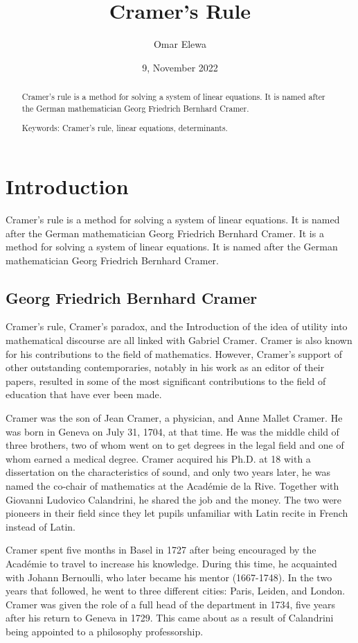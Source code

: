\documentclass[titlepage,a4paper]{article}
\title{Cramer's Rule}
\date{9, November 2022}
\author{Omar Elewa}
\begin{document}
  	\maketitle
    \begin{abstract}
        Cramer's rule is a method for solving a system of linear equations.
        It is named after the German mathematician Georg Friedrich Bernhard Cramer.
		
		Keywords: Cramer's rule, linear equations, determinants.
    \end{abstract}
  	\newpage
  	
	\section{Introduction}
    	Cramer's rule is a method for solving a system of linear equations.
    	It is named after the German mathematician Georg Friedrich Bernhard Cramer.
    	It is a method for solving a system of linear equations.
    	It is named after the German mathematician Georg Friedrich Bernhard Cramer.
    	\subsection{Georg Friedrich Bernhard Cramer}\label{subsec:georg-friedrich-bernhard-cramer}
				Cramer's rule, Cramer's paradox, and the Introduction of the idea of utility into mathematical discourse are all linked with Gabriel Cramer. Cramer is also known for his contributions to the field of mathematics. 
				However, Cramer's support of other outstanding contemporaries, notably in his work as an editor of their papers, resulted in some of the most significant contributions to the field of education that have ever been made.
 
				Cramer was the son of Jean Cramer, a physician, and Anne Mallet Cramer.
				He was born in Geneva on July 31, 1704, at that time.
				He was the middle child of three brothers, two of whom went on to get degrees in the legal field and one of whom earned a medical degree. Cramer acquired his Ph.D. at 18 with a dissertation on the characteristics of sound, and only two years later, he was named the co-chair of mathematics at the Académie de la Rive. 
				Together with Giovanni Ludovico Calandrini, he shared the job and the money. 
				The two were pioneers in their field since they let pupils unfamiliar with Latin recite in French instead of Latin.
	   
				Cramer spent five months in Basel in 1727 after being encouraged by the Académie to travel to increase his knowledge.
				During this time, he acquainted with Johann Bernoulli, who later became his mentor (1667-1748).
				In the two years that followed, he went to three different cities: Paris, Leiden, and London.
				Cramer was given the role of a full head of the department in 1734, five years after his return to Geneva in 1729.
				This came about as a result of Calandrini being appointed to a philosophy professorship.
	   
\end{document}
